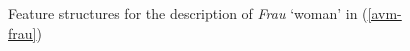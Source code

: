 \begin{figure}
\caption{\label{abb-avm-frau}Feature structures for the description of \emph{Frau} `woman' in (\ref{avm-frau})}
\end{figure}%
